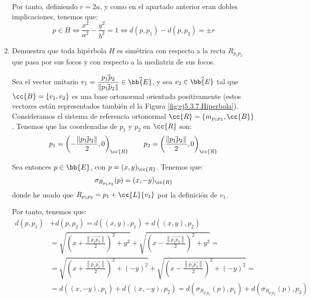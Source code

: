 \begin{ejercicio}
\begin{enumerate}
    Por tanto, definiendo $r=2a$, y como en el apartado anterior eran dobles implicaciones, tenemos que:
    \begin{equation*}
        p\in H \Longleftrightarrow \frac{x^2}{a^2} - \frac{y^2}{b^2} = 1
        \Longleftrightarrow d(p,p_1) - d(p,p_2) = \pm r
    \end{equation*}


    \item  Demuestra que toda hipérbola $H$ es simétrica con respecto a la recta $R_{p_1p_2}$ que pasa por sus focos y con respecto a la mediatriz de sus focos.
    
    Sea el vector unitario $v_1=\dfrac{\vec{p_1p_2}}{\left\|\vec{p_1p_2}\right\|}\in \vec{\bb{E}}$, y sea $v_2\in \vec{\bb{E}}$ tal que $\cc{B}=\{v_1,v_2\}$ es una base ortonormal orientada positivamente (estos vectores están representados también el la Figura \ref{fig:ej5.3.7.Hiperbola}).
    Consideramos el sistema de referencia ortonormal $\cc{R}=\{m_{p_1p_2},\cc{B}\}$. Tenemos que las coordenadas de $p_1$ y $p_2$ en $\cc{R}$ son:
    \begin{equation*}
        p_1 = \left(-\frac{\left\|\vec{p_1p_2}\right\|}{2}, 0\right)_{\cc{R}} \qquad
        p_2 = \left(\frac{\left\|\vec{p_1p_2}\right\|}{2}, 0\right)_{\cc{R}}
    \end{equation*}

    Sea entonces $p\in \bb{E}$, con $p=(x,y)_{\cc{R}}$. Tenemos que:
    \begin{equation*}
        \sigma_{R_{p_1p_2}}(p)= (x,-y)_{\cc{R}}
    \end{equation*}
    donde he usado que $R_{p_1p_2}=p_1+\cc{L}\{v_1\}$ por la definición de $v_1$.

    Por tanto, tenemos que:
    \begin{align*}
        d(p, p_1)& + d(p, p_2) = d((x,y), p_1) + d((x,y), p_2)\\&
        = \sqrt{\left(x+\frac{\left\|\vec{p_1p_2}\right\|}{2}\right)^2 + y^2} + \sqrt{\left(x-\frac{\left\|\vec{p_1p_2}\right\|}{2}\right)^2 + y^2} = \\&
        = \sqrt{\left(x+\frac{\left\|\vec{p_1p_2}\right\|}{2}\right)^2 + (-y)^2} + \sqrt{\left(x-\frac{\left\|\vec{p_1p_2}\right\|}{2}\right)^2 + (-y)^2} = \\ &
        = d((x,-y), p_1) + d((x,-y), p_2) = d(\sigma_{R_{p_1p_2}}(p), p_1) + d(\sigma_{R_{p_1p_2}}(p), p_2)
    \end{align*}


\end{enumerate}
\end{ejercicio}

